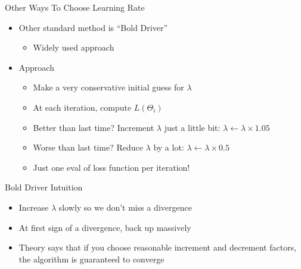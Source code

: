 \documentclass[aspectratio=169]{beamer}
\begin{document}
\begin{frame}{Other Ways To Choose Learning Rate}

\begin{itemize}
\item Other standard method is ``Bold Driver''
	\begin{itemize}
	\item Widely used approach
	\end{itemize}
	\item Approach
	\begin{itemize}
	\item Make a very conservative initial guess for $\lambda$
	\item At each iteration, compute $L (\Theta_{i})$ %
	\item Better than last time?  Increment $\lambda$ just a little bit: $\lambda \leftarrow \lambda \times 1.05$
	\item Worse than last time?  Reduce $\lambda$ by a lot: $\lambda \leftarrow \lambda \times 0.5$
	\item Just one eval of loss function per iteration! 
	\end{itemize}
\end{itemize}

\end{frame}
\begin{frame}{Bold Driver Intuition}

\begin{itemize}
\item Increase $\lambda$ slowly so we don't miss a divergence
\item At first sign of a divergence, back up massively
\item Theory says that if you choose reasonable increment and decrement factors, the algorithm is guaranteed to converge
\end{itemize}

\end{frame}
%
%
%
\end{document}
